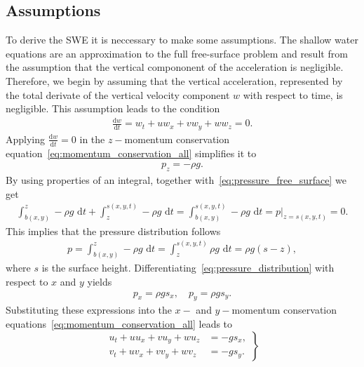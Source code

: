 \subsection{Assumptions}
To derive the SWE it is neccessary to make some assumptions. 
The shallow water equations are an approximation to the full free-surface problem and result from the assumption that the vertical compononent of the acceleration is negligible.
Therefore, we begin by assuming that the vertical acceleration, represented by the total derivate of the vertical velocity component $w$ with respect to time, is negligible.
This assumption leads to the condition
\begin{align*}
    \frac{\text{d} w}{\text{d} t} = w_t + uw_x + vw_y + ww_z = 0.
\end{align*}
Applying $\frac{\text{d}w}{\text{d}t} = 0$ in the $z-$momentum conservation equation~\eqref{eq:momentum_conservation_all} simplifies it to
\begin{align*}
    p_z = -\rho g.
\end{align*}
By using properties of an integral, together with~\eqref{eq:pressure_free_surface} we get
\begin{align*}
    \int_{b(x,y)}^z - \rho g \text{ d}t + \int_z^{s(x,y,t)} - \rho g \text{ d}t = \int_{b(x,y)}^{s(x,y,t)} - \rho g \text{ d}t
    = p|_{z = s(x,y,t)} = 0.
\end{align*}
This implies that the pressure distribution follows
\begin{align}\label{eq:pressure_distribution}
    p = \int_{b(x,y)}^z - \rho g \text{ d}t = \int_z^{s(x,y,t)} \rho g \text{ d}t = \rho g (s - z),
\end{align}
where $s$ is the surface height.
Differentiating~\eqref{eq:pressure_distribution} with respect to $x$ and $y$ yields
\begin{align*}%
    p_x = \rho g s_x, \quad p_y = \rho g s_y.
\end{align*}
Substituting these expressions into the $x-$ and $y-$momentum conservation equations~\eqref{eq:momentum_conservation_all} leads to 
\begin{equation}\label{eq:momentum_conservation_xy_simplified}
    \left.
    \begin{aligned}
        u_t + u u_x + v u_y + w u_z &= -g s_x,  \\
        v_t + u v_x + v v_y + w v_z &= -g s_y.
    \end{aligned}
    \right\}
\end{equation}

